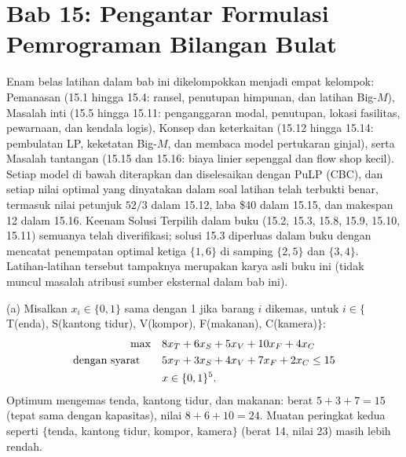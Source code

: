 
\section{Bab 15: Pengantar Formulasi Pemrograman Bilangan Bulat}

Enam belas latihan dalam bab ini dikelompokkan menjadi empat kelompok: Pemanasan (15.1 hingga 15.4: ransel, penutupan himpunan, dan latihan Big-$M$), Masalah inti (15.5 hingga 15.11: penganggaran modal, penutupan, lokasi fasilitas, pewarnaan, dan kendala logis), Konsep dan keterkaitan (15.12 hingga 15.14: pembulatan LP, keketatan Big-$M$, dan membaca model pertukaran ginjal), serta Masalah tantangan (15.15 dan 15.16: biaya linier sepenggal dan flow shop kecil). Setiap model di bawah diterapkan dan diselesaikan dengan PuLP (CBC), dan setiap nilai optimal yang dinyatakan dalam soal latihan telah terbukti benar, termasuk nilai petunjuk $52/3$ dalam 15.12, laba \$40 dalam 15.15, dan makespan 12 dalam 15.16. Keenam Solusi Terpilih dalam buku (15.2, 15.3, 15.8, 15.9, 15.10, 15.11) semuanya telah diverifikasi; solusi 15.3 diperluas dalam buku dengan mencatat penempatan optimal ketiga $\{1,6\}$ di samping $\{2,5\}$ dan $\{3,4\}$. Latihan-latihan tersebut tampaknya merupakan karya asli buku ini (tidak muncul masalah atribusi sumber eksternal dalam bab ini).


(a) Misalkan $x_i \in \{0,1\}$ sama dengan 1 jika barang $i$ dikemas, untuk $i \in \{$T(enda), S(kantong tidur), V(kompor), F(makanan), C(kamera)$\}$:
\[
\begin{aligned}
\max\quad & 8x_T + 6x_S + 5x_V + 10x_F + 4x_C\\
\mbox{dengan syarat}\quad\quad & 5x_T + 3x_S + 4x_V + 7x_F + 2x_C \leq 15\\
& x \in \{0,1\}^5.
\end{aligned}
\]
Optimum mengemas tenda, kantong tidur, dan makanan: berat $5+3+7 = 15$ (tepat sama dengan kapasitas), nilai $8+6+10 = 24$. Muatan peringkat kedua seperti $\{$tenda, kantong tidur, kompor, kamera$\}$ (berat 14, nilai 23) masih lebih rendah.

